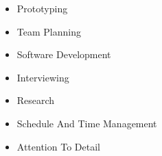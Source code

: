 
  \begin{itemize}
    \setlength\itemsep{-0.3em}
    \item Prototyping
    \item Team Planning
    \item Software Development
    \item Interviewing %
    \item Research
    \item Schedule And Time Management
    \item Attention To Detail
  \end{itemize}
